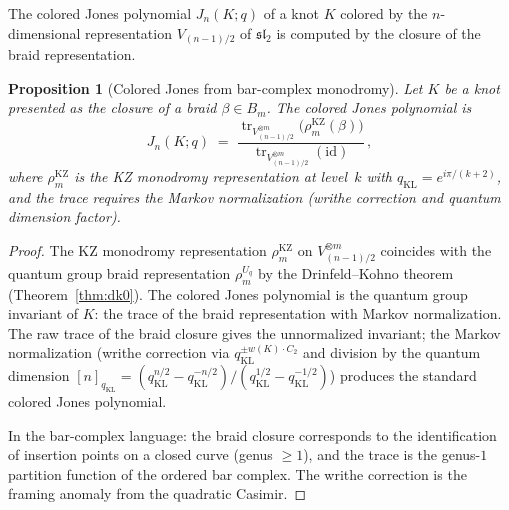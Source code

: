 \documentclass[11pt,reqno]{amsart}
\newtheorem{proposition}[theorem]{Proposition}
\theoremstyle{definition}
\theoremstyle{remark}
\DeclareMathOperator{\tr}{tr}
\newcommand{\id}{\mathrm{id}}
\numberwithin{equation}{section}
\begin{document}
The colored Jones polynomial $J_n(K; q)$ of a knot $K$
colored by the $n$-dimensional representation $V_{(n-1)/2}$
of $\mathfrak{sl}_2$ is computed by the closure of the
braid representation.

\begin{proposition}[Colored Jones from bar-complex monodromy]
\label{prop:dk-jones}
Let $K$ be a knot presented as the closure of a braid
$\beta \in B_m$.  The colored Jones polynomial is
\begin{equation}\label{eq:dk-jones}
J_n(K; q)
\;=\;
\frac{
\tr_{V_{(n-1)/2}^{\otimes m}}
\bigl(
\rho_m^{\mathrm{KZ}}(\beta)
\bigr)
}{
\tr_{V_{(n-1)/2}^{\otimes m}}(\id)
}\,,
\end{equation}
where $\rho_m^{\mathrm{KZ}}$ is the KZ monodromy
representation at level~$k$ with
$q_{\mathrm{KL}} = e^{i\pi/(k+2)}$, and the trace requires the Markov
normalization \textup{(}writhe correction and quantum
dimension factor\textup{)}.
\end{proposition}

\begin{proof}
The KZ monodromy representation $\rho_m^{\mathrm{KZ}}$ on
$V_{(n-1)/2}^{\otimes m}$ coincides with the quantum group
braid representation $\rho_m^{U_q}$ by the Drinfeld--Kohno
theorem (Theorem~\ref{thm:dk0}).
The colored Jones polynomial is the quantum group invariant
of $K$: the trace of the braid representation with Markov
normalization.  The raw trace of the braid closure gives
the unnormalized invariant; the Markov normalization
(writhe correction via \(q_{\mathrm{KL}}^{\pm w(K) \cdot C_2}\) and
division by the quantum dimension
$[n]_{q_{\mathrm{KL}}}
= (q_{\mathrm{KL}}^{n/2} - q_{\mathrm{KL}}^{-n/2})/
(q_{\mathrm{KL}}^{1/2} - q_{\mathrm{KL}}^{-1/2})$)
produces the standard colored Jones polynomial.

In the bar-complex language: the braid closure corresponds
to the identification of insertion points on a closed curve
(genus $\geq 1$), and the trace is the genus-$1$ partition
function of the ordered bar complex.  The writhe correction
is the framing anomaly from the quadratic Casimir.
\end{proof}
\end{document}
